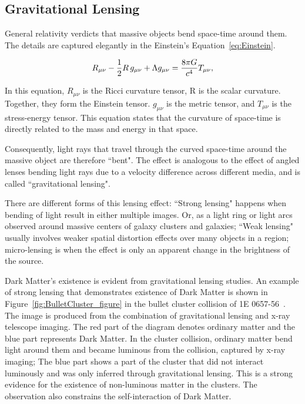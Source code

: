 \subsection{Gravitational Lensing}
General relativity verdicts that massive objects bend space-time around them. The details are captured elegantly in the Einstein's Equation~\ref{eq:Einstein}. 

\begin{equation}
	R_{\mu \nu} - {1 \over 2}R \, g_{\mu \nu} + \Lambda g_{\mu \nu}= {8 \pi G \over c^4} T_{\mu \nu}, 
    \label{eq:Einstein}
\end{equation}

In this equation, $R_{\mu \nu}$ is the Ricci curvature tensor, R is the scalar curvature. Together, they form the Einstein tensor. $g_{\mu \nu}$ is the metric tensor, and $T_{\mu \nu}$ is the stress-energy tensor. This equation states that the curvature of space-time is directly related to the mass and energy in that space. 	
	
	Consequently, light rays that travel through the curved space-time around the massive object are therefore ``bent". The effect is analogous to the effect of angled lenses bending light rays due to a velocity difference across different media, and is called ``gravitational lensing". 

    There are different forms of this lensing effect: ``Strong lensing" happens when bending of light result in either multiple images. Or, as a light ring or light arcs observed around massive centers of galaxy clusters and galaxies; ``Weak lensing" usually involves weaker spatial distortion effects over many objects in a region; micro-lensing is when the effect is only an apparent change in the brightness of the source.

    Dark Matter's existence is evident from gravitational lensing studies. An example of strong lensing that demonstrates existence of Dark Matter is shown in Figure~\ref{fig:BulletCluster_figure} in the bullet cluster collision of 1E 0657-56~\cite{BulletCluster}. The image is produced from the combination of gravitational lensing and x-ray telescope imaging. The red part of the diagram denotes ordinary matter and the blue part represents Dark Matter. In the cluster collision, ordinary matter
    bend light around them and became luminous from the collision, captured by x-ray imaging; The blue part shows a part of the cluster that did not interact luminously and was only inferred through gravitational lensing. This is a strong evidence for the existence of non-luminous matter in the clusters. The observation also constrains the self-interaction of Dark Matter.


